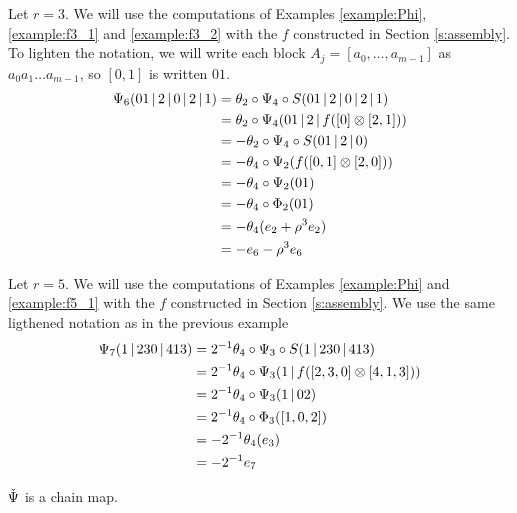 \begin{example}\label{example:psi3}
Let $r=3$. We will use the computations of Examples \ref{example:Phi}, \ref{example:f3_1} and \ref{example:f3_2} with the $f$ constructed in Section \ref{s:assembly}. To lighten the notation, we will write each block $A_j = [a_0,\ldots,a_{m-1}]$ as $a_0a_1\ldots a_{m-1}$, so $[0,1]$ is written $01$.
	\begin{align*}
		\Psi_6(01\operatorname{|} 2\operatorname{|} 0\operatorname{|} 2\operatorname{|} 1)
		&= \theta_2\circ \Psi_4\circ S(01\operatorname{|} 2\operatorname{|} 0\operatorname{|} 2\operatorname{|} 1)
		\\
		&= \theta_2\circ \Psi_4(01\operatorname{|} 2\operatorname{|} f([0] \otimes  [2,1]))
		\\
		&= -\theta_2\circ \Psi_4\circ S(01\operatorname{|} 2\operatorname{|} 0)
		\\
		&= -\theta_4\circ \Psi_2(f([0,1] \otimes  [2,0]))
		\\
		&= -\theta_4\circ \Psi_2(01)
		\\
		&= -\theta_4\circ \Phi_2(01)
		\\
		&= -\theta_4(e_2 + \rho^3e_2)
		\\
		&= -e_6 - \rho^3e_6
	\end{align*}
\end{example}
\begin{example}\label{example:psi5}
Let $r=5$. We will use the computations of Examples \ref{example:Phi} and \ref{example:f5_1} with the $f$ constructed in Section \ref{s:assembly}. We use the same ligthened notation as in the previous example
	\begin{align*}
		\Psi_7(1\operatorname{|} 230\operatorname{|} 413)
		&= 2^{-1}\theta_4\circ \Psi_3\circ S(1\operatorname{|} 230\operatorname{|} 413)
		\\
		&= 2^{-1}\theta_4\circ \Psi_3(1\operatorname{|} f([2,3,0] \otimes  [4,1,3]))
		\\
		&= 2^{-1}\theta_4\circ \Psi_3(1\operatorname{|} 02)
		\\
		&= 2^{-1}\theta_4\circ \Phi_3([1,0,2])
		\\
		&= -2^{-1}\theta_4(e_3)
		\\
		&= -2^{-1}e_7
	\end{align*}
\end{example}

\begin{proposition}\label{prop:chain}
	$\operatorname{\check{\Psi}}$ is a chain map. %
\end{proposition}

